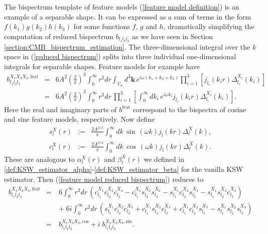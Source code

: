 The bispectrum template of feature models (\ref{feature model definition}) is an example of a separable shape. It can be expressed as a sum of terms in the form $f(k_1)g(k_2)h(k_3)$ for some functions $f$, $g$ and $h$, dramatically simplifying the computation of reduced bispectrum $b_{l_1 l_2 l_3}$ as we have seen in Section \ref{section:CMB_bispectrum_estimation}. The three-dimensional integral over the $k$ space in (\ref{reduced bispectrum}) splits into three individual one-dimensional integrals for separable shapes. Feature models for example have
\begin{eqnarray}
	b_{l_1 l_2 l_3}^{X_1 X_2 X_3,\text{feat}} &=& 6A^2 \left( \frac{2}{\pi} \right)^3 \int_0^\infty r^2 dr \int_{\mathcal{V}_k} d^3\mathbf{k}\, e^{i\omega (k_1 + k_2 + k_3)} \prod_{i=1}^{3} \left[ j_{l_i} (k_i r) \Delta_{l_i}^{X_i} (k_i) \right] \nonumber \\
	&=&  6A^2 \left( \frac{2}{\pi} \right)^3 \int_0^\infty r^2 dr \, \prod_{i=1}^{3} \left[ \int_0^\infty dk_i \, e^{i \omega k_i} j_{l_i} (k_i r) \Delta_{l_i}^{X_i} (k_i) \right]. \label{feature model reduced bispectrum}
\end{eqnarray}
Here the real and imaginary parts of $b^\text{feat}$ correspond to the bispectra of cosine and sine feature models, respectively. Now define
\begin{eqnarray}
	s_l^X(r) &:=& \frac{2A^{2/3}}{\pi} \int_0^\infty dk \, \sin\,(\omega k) j_l(kr) \Delta_l^X(k), \\
	c_l^X(r) &:=& \frac{2A^{2/3}}{\pi} \int_0^\infty dk \, \cos\,(\omega k) j_l(kr) \Delta_l^X(k).
\end{eqnarray}
These are analogous to $\alpha_l^X(r)$ and $\beta_l^X(r)$ we defined in \eqref{def:KSW_estimator_alpha}-\eqref{def:KSW_estimator_beta} for the vanilla KSW estimator. Then (\ref{feature model reduced bispectrum}) reduces to
\begin{eqnarray}
	b_{l_1 l_2 l_3}^{X_1 X_2 X_3, \text{feat}} &=& 6 \int_0^\infty r^2 dr \, \left(c_{l_1}^{X_1} c_{l_2}^{X_2} c_{l_3}^{X_3} -  c_{l_1}^{X_1} s_{l_2}^{X_2} s_{l_3}^{X_3} -  s_{l_1}^{X_1} c_{l_2}^{X_2} s_{l_3}^{X_3} -  s_{l_1}^{X_1} s_{l_2}^{X_2} c_{l_3}^{X_3} \right)  \nonumber \\
	&\quad& +\; 6i  \int_0^\infty r^2 dr \, \left(s_{l_1}^{X_1}c_{l_2}^{X_2}c_{l_3}^{X_3} + c_{l_1}^{X_1}s_{l_2}^{X_2}c_{l_3}^{X_3} +  c_{l_1}^{X_1}c_{l_2}^{X_2}s_{l_3}^{X_3} -  s_{l_1}^{X_1}s_{l_2}^{X_2}s_{l_3}^{X_3} \right) 	\nonumber \\
	&=& b_{l_1 l_2 l_3}^{X_1 X_2 X_3, \text{cos}} + i \; b_{l_1 l_2 l_3}^{X_1 X_2 X_3, \text{sin}}.
	\label{feature model reduced bispectrum sin and cos}
\end{eqnarray}


